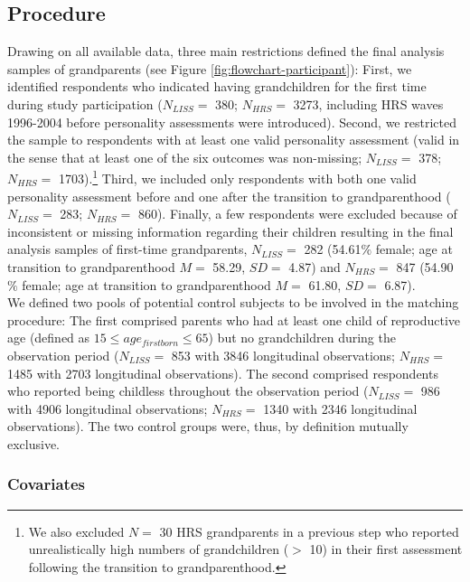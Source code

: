 \documentclass[
  english,
  man,floatsintext]{apa7}
\begin{document}
\hypertarget{procedure}{%
\subsection{Procedure}\label{procedure}}

Drawing on all available data, three main restrictions defined the final analysis samples of grandparents (see Figure \ref{fig:flowchart-participant}): First, we identified respondents who indicated having grandchildren for the first time during study participation (\(N_{LISS} =\) 380; \(N_{HRS} =\) 3273, including HRS waves 1996-2004 before personality assessments were introduced). Second, we restricted the sample to respondents with at least one valid personality assessment (valid in the sense that at least one of the six outcomes was non-missing; \(N_{LISS} =\) 378; \(N_{HRS} =\) 1703).\footnote{We also excluded \(N =\) 30 HRS grandparents in a previous step who reported unrealistically high numbers of grandchildren (\(>\) 10) in their first assessment following the transition to grandparenthood.} Third, we included only respondents with both one valid personality assessment before and one after the transition to grandparenthood (\(N_{LISS} =\) 283; \(N_{HRS} =\) 860). Finally, a few respondents were excluded because of inconsistent or missing information regarding their children resulting in the final analysis samples of first-time grandparents, \(N_{LISS} =\) 282 (54.61\(\%\) female; age at transition to grandparenthood \(M =\) 58.29, \(SD =\) 4.87) and \(N_{HRS} =\) 847 (54.90\(\%\) female; age at transition to grandparenthood \(M =\) 61.80, \(SD =\) 6.87).\\
We defined two pools of potential control subjects to be involved in the matching procedure: The first comprised parents who had at least one child of reproductive age (defined as \(15 \leq age_{firstborn}\leq65\)) but no grandchildren during the observation period (\(N_{LISS} =\) 853 with 3846 longitudinal observations; \(N_{HRS} =\) 1485 with 2703 longitudinal observations). The second comprised respondents who reported being childless throughout the observation period (\(N_{LISS} =\) 986 with 4906 longitudinal observations; \(N_{HRS} =\) 1340 with 2346 longitudinal observations). The two control groups were, thus, by definition mutually exclusive.

\hypertarget{covariates}{%
\subsubsection{Covariates}\label{covariates}}
\end{document}
